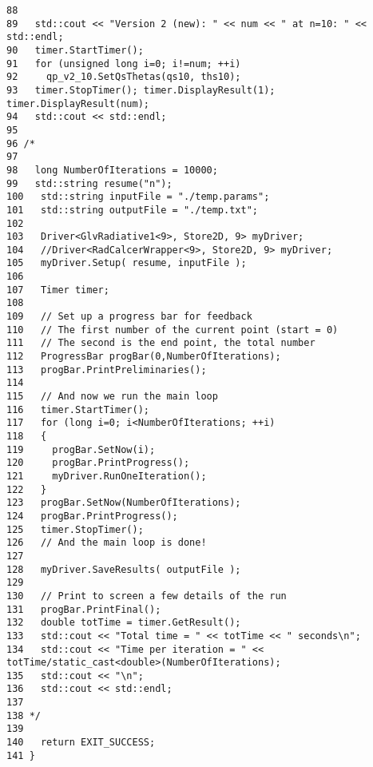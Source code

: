 \begin{Code}
\begin{verbatim}
88 
89   std::cout << "Version 2 (new): " << num << " at n=10: " << std::endl;
90   timer.StartTimer();
91   for (unsigned long i=0; i!=num; ++i)
92     qp_v2_10.SetQsThetas(qs10, ths10);
93   timer.StopTimer(); timer.DisplayResult(1); timer.DisplayResult(num);
94   std::cout << std::endl;
95 
96 /*
97 
98   long NumberOfIterations = 10000;
99   std::string resume("n");
100   std::string inputFile = "./temp.params";
101   std::string outputFile = "./temp.txt";
102   
103   Driver<GlvRadiative1<9>, Store2D, 9> myDriver;
104   //Driver<RadCalcerWrapper<9>, Store2D, 9> myDriver;
105   myDriver.Setup( resume, inputFile );
106 
107   Timer timer;
108 
109   // Set up a progress bar for feedback
110   // The first number of the current point (start = 0)
111   // The second is the end point, the total number
112   ProgressBar progBar(0,NumberOfIterations);
113   progBar.PrintPreliminaries();
114   
115   // And now we run the main loop
116   timer.StartTimer();
117   for (long i=0; i<NumberOfIterations; ++i)
118   {
119     progBar.SetNow(i);
120     progBar.PrintProgress();
121     myDriver.RunOneIteration();
122   }
123   progBar.SetNow(NumberOfIterations);
124   progBar.PrintProgress();
125   timer.StopTimer();
126   // And the main loop is done!
127 
128   myDriver.SaveResults( outputFile );
129  
130   // Print to screen a few details of the run
131   progBar.PrintFinal();
132   double totTime = timer.GetResult();
133   std::cout << "Total time = " << totTime << " seconds\n";
134   std::cout << "Time per iteration = " << totTime/static_cast<double>(NumberOfIterations);
135   std::cout << "\n";
136   std::cout << std::endl;
137 
138 */
139 
140   return EXIT_SUCCESS;
141 }
\end{verbatim}
\end{Code}


